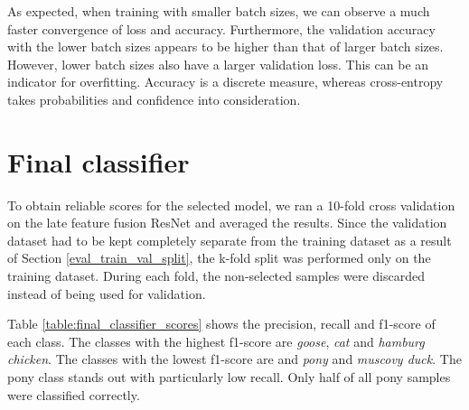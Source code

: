 \documentclass{l4proj}
\begin{document}
As expected, when training with smaller batch sizes, we can observe a much faster convergence of loss and accuracy. Furthermore, the validation accuracy with the lower batch sizes appears to be higher than that of larger batch sizes. However, lower batch sizes also have a larger validation loss. This can be an indicator for overfitting. Accuracy is a discrete measure, whereas cross-entropy takes probabilities and confidence into consideration.


\section{Final classifier}

To obtain reliable scores for the selected model, we ran a 10-fold cross validation on the late feature fusion ResNet and averaged the results. Since the validation dataset had to be kept completely separate from the training dataset as a result of Section \ref{eval_train_val_split}, the k-fold split was performed only on the training dataset. During each fold, the non-selected samples were discarded instead of being used for validation.

Table \ref{table:final_classifier_scores} shows the precision, recall and f1-score of each class. The classes with the highest f1-score are \textit{goose}, \textit{cat} and \textit{hamburg chicken}. The classes with the lowest f1-score are and \textit{pony} and \textit{muscovy duck}. The pony class stands out with particularly low recall. Only half of all pony samples were classified correctly.
\end{document}
